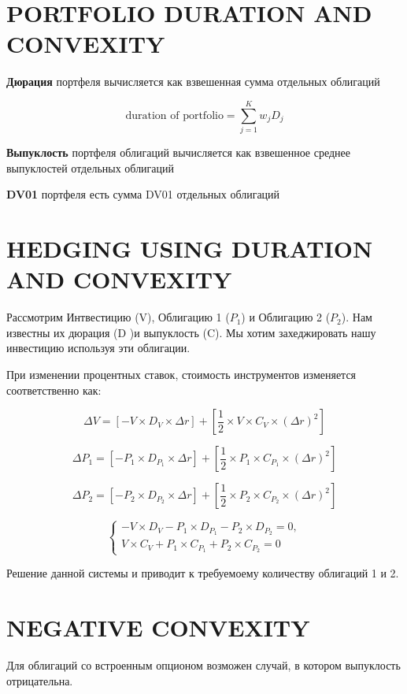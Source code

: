 \documentclass[a4paper,12pt]{article}
\begin{document}
\section{PORTFOLIO DURATION AND CONVEXITY}

\textbf{Дюрация} портфеля вычисляется как взвешенная сумма отдельных облигаций

\[ \text{duration of portfolio} = \sum_{j=1}^{K} w_j D_j \]

\textbf{Выпуклость} портфеля облигаций вычисляется как взвешенное среднее выпуклостей отдельных облигаций

\textbf{DV01} портфеля есть сумма  DV01 отдельных облигаций 

\section{HEDGING USING DURATION AND CONVEXITY}

Рассмотрим Интвестицию (V), Облигацию 1 ($P_1$) и Облигацию 2 ($P_2$). Нам известны их дюрация (D )и выпуклость (C). Мы хотим захеджировать нашу инвестицию используя эти облигации.

При изменении процентных ставок, стоимость инструментов изменяется соответственно как:

\[ \Delta V = [-V \times D_V \times \Delta r ] + [\frac{1}{2} \times V \times C_V \times (\Delta r)^2]  \]


\[ \Delta P_1 = [-P_1 \times D_{P_1} \times \Delta r ] + [\frac{1}{2} \times P_1 \times C_{P_1} \times (\Delta r)^2]  \]


\[ \Delta P_2 = [-P_2 \times D_{P_2} \times \Delta r ] + [\frac{1}{2} \times P_2 \times C_{P_2} \times (\Delta r)^2]  \]

\begin{equation*}
 \begin{cases}
     -V \times D_V - P_1 \times D_{P_1} - P_2\times D_{P_2} = 0, 
   \\
   V \times C_V + P_1 \times C_{P_1} + P_2 \times C_{P_2} = 0
 \end{cases}
\end{equation*}

Решение данной системы и приводит к требуемоему количеству облигаций 1 и 2.


\section{NEGATIVE CONVEXITY}

Для облигаций со встроенным опционом возможен случай, в котором выпуклость отрицательна.
\end{document}
